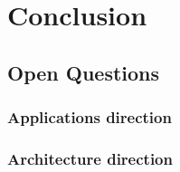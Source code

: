 \chapter{Conclusion}
\label{chp:conclusion}

\section{Open Questions}

\subsection{Applications direction}

\subsection{Architecture direction}
